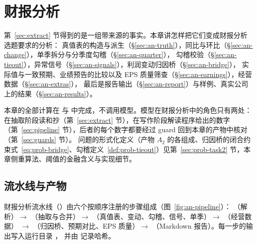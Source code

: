 \section{财报分析}
\label{sec:analysis}

第~\ref{sec:extract} 节得到的是一组带来源的事实。本章讲\sysname{}怎样把它们变成财报分析选题要求的分析：
真值表的构造与派生（\S\ref{sec:an-truth}），同比与环比（\S\ref{sec:an-change}），单季拆分与分季度勾稽（\S\ref{sec:an-quarter}），
勾稽校验（\S\ref{sec:an-tieout}），异常信号（\S\ref{sec:an-signals}），利润变动归因桥（\S\ref{sec:an-bridge}），
实际值与一致预期、业绩预告的比较以及 EPS 质量筛查（\S\ref{sec:an-earnings}），经营数据（\S\ref{sec:an-extras}），
最后是报告输出（\S\ref{sec:an-report}）与样例、真实公司上的结果（\S\ref{sec:an-results}）。

本章的全部计算在  与  中完成，不调用模型。模型在财报分析中的角色只有两处：
在抽取阶段读和抄（第~\ref{sec:extract} 节），在写作阶段解读程序给出的数字（第~\ref{sec:pipeline} 节），后者的每个数字都要经过 guard 回到本章的产物中核对（第~\ref{sec:guards} 节）。
问题的形式化定义（产物 $A_2$ 的各组成、归因桥的闭合约束式~\ref{eq:prob-bridge}、勾稽定义~\ref{def:prob-tieout}）见第~\ref{sec:prob-task2} 节，本章侧重算法、阈值的金融含义与实现细节。

\subsection{流水线与产物}
\label{sec:an-pipeline}

财报分析流水线（）由六个按顺序注册的步骤组成（图~\ref{fig:an-pipeline}）：
（解析）$\to$ （抽取与合并）$\to$ （真值表、变动、勾稽、信号、单季）$\to$ （经营数据）
$\to$ （归因桥、预期对比、EPS 质量）$\to$ （Markdown 报告）。每一步的输出写入运行目录 ，
并由  记录哈希。

